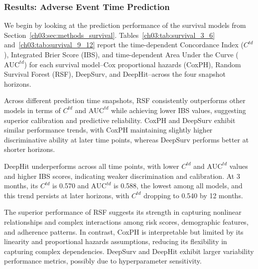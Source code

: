 \subsubsection{Results: Adverse Event Time Prediction}
\label{ch03:sec:04_results_survival}

We begin by looking at the prediction performance of the survival models from Section~\ref{ch03:sec:methods_survival}.
Tables~\ref{ch03:tab:survival_3_6} and~\ref{ch03:tab:survival_9_12} report the time-dependent Concordance Index (\(C^{td}\)), Integrated Brier Score (IBS), and time-dependent Area Under the Curve (\(\text{AUC}^{td}\)) for each survival model--Cox proportional hazards (CoxPH), Random Survival Forest (RSF), DeepSurv, and DeepHit--across the four snapshot horizons. 

Across different prediction time snapshots, RSF consistently outperforms other models in terms of \(C^{td}\) and \(\text{AUC}^{td}\) while achieving lower IBS values, suggesting superior calibration and predictive reliability.
CoxPH and DeepSurv exhibit similar performance trends, with CoxPH maintaining slightly higher discriminative ability at later time points, whereas DeepSurv performs better at shorter horizons.

DeepHit underperforms across all time points, with lower \(C^{td}\) and \(\text{AUC}^{td}\) values and higher IBS scores, indicating weaker discrimination and calibration.
At 3 months, its \(C^{td}\) is 0.570 and \(\text{AUC}^{td}\) is 0.588, the lowest among all models, and this trend persists at later horizons, with \(C^{td}\) dropping to 0.540 by 12 months.

The superior performance of RSF suggests its strength in capturing nonlinear relationships and complex interactions among risk scores, demographic features, and adherence patterns.
In contrast, CoxPH is interpretable but limited by its linearity and proportional hazards assumptions, reducing its flexibility in capturing complex dependencies.
DeepSurv and DeepHit exhibit larger variability performance metrics, possibly due to hyperparameter sensitivity.


